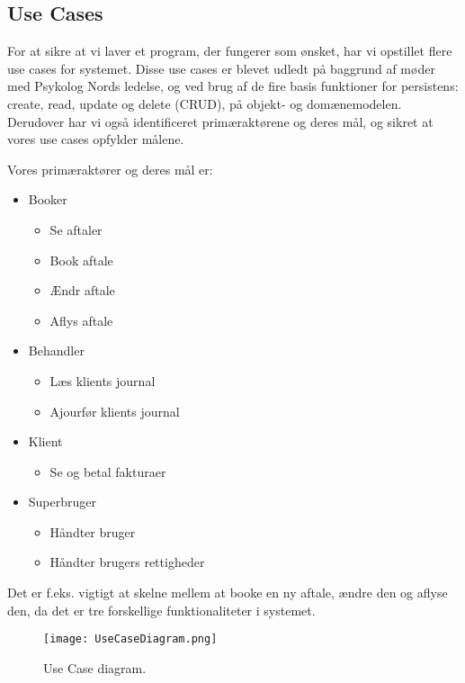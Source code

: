 \subsection{Use Cases}
For at sikre at vi laver et program, der fungerer som ønsket, har vi opstillet flere use cases for systemet.
Disse use cases er blevet udledt på baggrund af møder med Psykolog Nords ledelse, og ved brug af de fire basis funktioner for persistens: create, read, update og delete (CRUD), på objekt- og domænemodelen.
Derudover har vi også identificeret primæraktørene og deres mål, og sikret at vores use cases opfylder målene.

Vores primæraktører og deres mål er:

\begin{itemize}
    \item Booker
        \begin{itemize}
            \item Se aftaler
            \item Book aftale
            \item Ændr aftale
            \item Aflys aftale
        \end{itemize}
    \item Behandler
        \begin{itemize}
            \item Læs klients journal
            \item Ajourfør klients journal
        \end{itemize}
    \item Klient
        \begin{itemize}
            \item Se og betal fakturaer
        \end{itemize}
    \item Superbruger
        \begin{itemize}
            \item Håndter bruger
            \item Håndter brugers rettigheder
        \end{itemize}

\end{itemize}

Det er f.eks. vigtigt at skelne mellem at booke en ny aftale, ændre den og aflyse den, da det er tre forskellige funktionaliteter i systemet.

\begin{figure}[p]
	\centering
  		\texttt{[image: UseCaseDiagram.png]}
  \caption{Use Case diagram.}
  \label{fig:UseCaseDiagram}
\end{figure}

